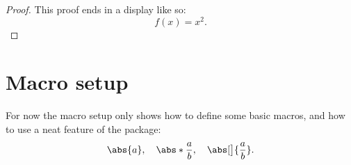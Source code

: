 \begin{proof}
  This proof ends in a display like so:
  \begin{displaymath}
    f(x) = x^2.
  \end{displaymath}
\end{proof}


\chapter{Macro setup}

For now the macro setup only shows how to define some basic macros,
and how to use a neat feature of the  package:
\begin{displaymath}
  \abs{a}, \quad \abs*{\frac{a}{b}}, \quad \abs[\big]{\frac{a}{b}}.
\end{displaymath}
